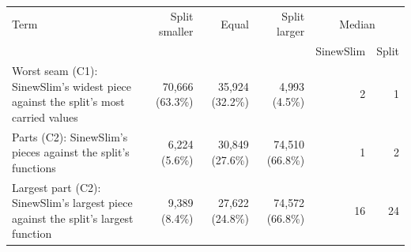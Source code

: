 \begin{tabular}{>{\raggedright\arraybackslash}p{5.6cm}rrrrr}
\toprule
Term & Split smaller & Equal & Split larger & \multicolumn{2}{c}{Median} \\
 & & & & SinewSlim & Split \\
\midrule
Worst seam (C1): SinewSlim's widest piece against the split's most carried values & 70{,}666 (63.3\%) & 35{,}924 (32.2\%) & 4{,}993 (4.5\%) & 2 & 1 \\
Parts (C2): SinewSlim's pieces against the split's functions & 6{,}224 (5.6\%) & 30{,}849 (27.6\%) & 74{,}510 (66.8\%) & 1 & 2 \\
Largest part (C2): SinewSlim's largest piece against the split's largest function & 9{,}389 (8.4\%) & 27{,}622 (24.8\%) & 74{,}572 (66.8\%) & 16 & 24 \\
\bottomrule
\end{tabular}
